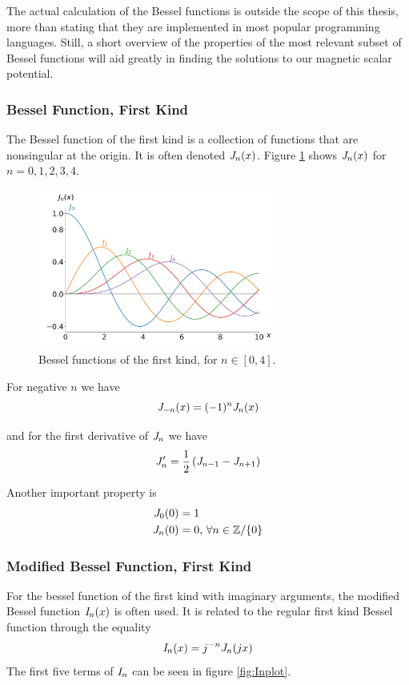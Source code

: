 The actual calculation of the Bessel functions is outside the scope of this thesis,
more than stating that they are implemented in most popular programming languages.
Still, a short overview of the properties of the most relevant subset of Bessel
functions will aid greatly in finding the solutions to our magnetic scalar potential.
\cite{weisstein_bessel}
\subsubsection{Bessel Function, First Kind}

The Bessel function of the first kind is a collection of functions that are nonsingular
at the origin. It is often denoted $\mathit{J}_{n}(x)$. Figure \ref*{fig:Jnplot} shows
$\mathit{J}_{n}(x)$ for $n=0,1,2,3,4$.

\begin{figure}[h]
    \centering
    \includegraphics[width=0.7\textwidth]{figs/Jnplot.png}
    \caption{Bessel functions of the first kind, for $n\in[0,4]$.}
    \label{fig:Jnplot}
\end{figure}

For negative $n$ we have
\begin{equation}
    \mathit{J}_{-n}(x) = (-1)^n \mathit{J}_{n}(x)
\end{equation}

and for the first derivative of $\mathit{J}_{n}$ we have
\begin{equation}
    \mathit{J}_{n}' = \frac{1}{2}\left( \mathit{J}_{n-1} -  \mathit{J}_{n+1} \right)
\end{equation}

Another important property is
\begin{align}
    \mathit{J}_{0}(0) & = 1                                  \\
    \mathit{J}_{n}(0) & = 0, \, \forall n\in\mathbb{Z}/\{0\}
\end{align}
\cite{weisstein_bessel_first_kind}
\subsubsection{Modified Bessel Function, First Kind}
For the bessel function of the first kind with imaginary
arguments, the modified Bessel function $\mathit{I}_{n}(x)$ is often used.
It is related to the regular first kind Bessel function
through the equality
\begin{equation}
    \mathit{I}_{n}(x) = j^{-n}\mathit{J}_{n}(jx)
\end{equation}
\cite{weisstein_modified}
The first five terms of $\mathit{I}_{n}$ can be seen in figure \ref*{fig:Inplot}.

